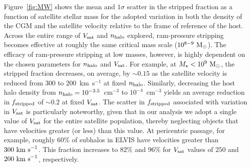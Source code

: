 \documentclass[usenatbib]{mn2e}
\newcommand{\mstar}{{M}_{\star}}
\newcommand{\msun}{{\rm M}_{\odot}}
\begin{document}
Figure~\ref{fig:MW} shows the mean and $1\sigma$ scatter in the
stripped fraction as a function of satellite stellar mass for the
adopted variation in both the density of the CGM and the satellite
velocity relative to the frame of reference of the host.
%
Across the entire range of $V_{\rm sat}$ and $n_{\rm halo}$ explored,
ram-pressure stripping becomes effective at roughly the same critical
mass scale ($10^{8-9}~\msun$).
%
The efficacy of ram-pressure stripping at low masses, however, is
highly dependent on the chosen parameters for $n_{\rm halo}$ and
$V_{\rm sat}$.
%
For example, at $\mstar < 10^{9}~\msun$, the stripped fraction
decreases, on average, by $\sim0.15$ as the satellite velocity is
reduced from $300$ to $200$~km~s$^{-1}$ at fixed $n_{\rm halo}$.
%
Similarly, decreasing the host halo density from $n_{\rm halo} =
10^{-3.5}$~cm$^{-3}$ to $10^{-4}$~cm$^{-3}$ yields an average
reduction in $f_{\rm stripped}$ of $\sim0.2$ at fixed $V_{\rm sat}$.
%
The scatter in $f_{\rm stripped}$ associated with variation in $V_{\rm
  sat}$ is particularly noteworthy, given that in our analysis we
adopt a single value of $V_{\rm sat}$ for the entire satellite
population, thereby neglecting objects that have velocities greater
(or less) than this value. 
%
At pericentric passage, for example, roughly $60\%$ of subhalos in
ELVIS have velocities greater than $300~{\rm km~s}^{-1}$. This
fraction increases to $82\%$ and $96\%$ for $V_{\rm sat}$ values of
$250$ and $200~{\rm km~s}^{-1}$, respectively.


\end{document}

